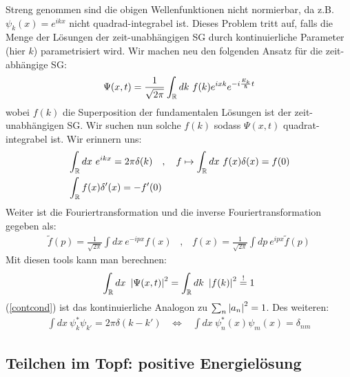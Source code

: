 Streng genommen sind die obigen Wellenfunktionen nicht normierbar, da z.B.
$\psi_k (x) = e^{i k x}$ nicht quadrad-integrabel ist. Dieses Problem tritt auf,
falls die Menge der Lösungen der zeit-unabhängigen SG durch kontinuierliche
Parameter (hier $k$) parametrisiert wird. Wir machen neu den folgenden Ansatz
für die zeit-abhängige SG:
\begin{align*}
    \Psi(x,t) = \frac{1}{\sqrt{2 \pi}} \int_{\mathbb{R}} dk \ f(k) e^{i x k} e^{-i \frac{E_k}{\hbar} t}
\end{align*}
wobei $f(k)$ die Superposition der fundamentalen Lösungen ist der zeit-unabhängigen
SG. Wir suchen nun solche $f(k)$ sodass $\Psi(x,t)$ quadrat-integrabel ist.
Wir erinnern uns:
\begin{align*}
    &\int_{\mathbb{R}} dx \ e^{i k x} = 2 \pi \delta(k)
    \hspace{10pt} , \hspace{10pt}
    f \mapsto \int_{\mathbb{R}} dx \ f(x) \delta(x) = f(0)
    \\
    &\int_{\mathbb{R}} f(x) \delta'(x) = - f'(0)
\end{align*}
Weiter ist die Fouriertransformation und die inverse Fouriertransformation
gegeben als:
\begin{align*}
    \tilde{f}(p) = \frac{1}{\sqrt{2 \pi}} \int dx \ e^{-i p x} f(x)
    \hspace{10pt} , \hspace{10pt}
    f(x) = \frac{1}{\sqrt{2 \pi}} \int dp \ e^{i p x} \tilde{f}(p)
\end{align*}
Mit diesen tools kann man berechnen:
\begin{align}\label{contcond}
    \int_{\mathbb{R}} dx \ \left\vert \Psi(x,t) \right\vert^2 = \int_{\mathbb{R}} dk \ \left\vert f(k) \right\vert^2
    \stackrel{!}{=} 1
\end{align}
(\ref{contcond}) ist das kontinuierliche Analogon zu $\sum_n \left\vert a_n \right\vert^2 = 1$.
Des weiteren:
\begin{align*}
    \int dx \ \psi_k^\ast \psi_{k'} = 2 \pi \delta(k-k')
    \hspace{10pt} \Leftrightarrow \hspace{10pt}
    \int dx \ \psi_n^\ast (x) \psi_m (x) = \delta_{n m}
\end{align*}

\subsection{Teilchen im Topf: positive Energielösung}


